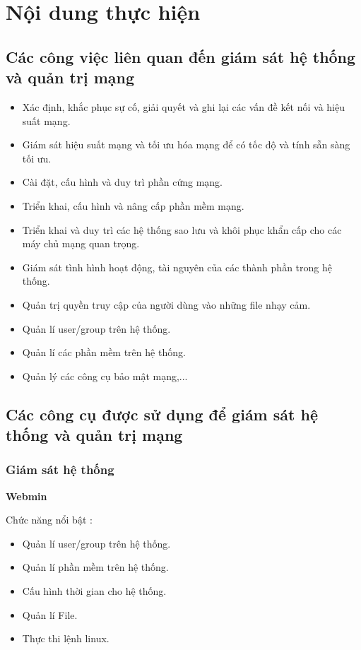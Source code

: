 \chapter{Nội dung thực hiện} \label{chap:theory}
    \section{Các công việc liên quan đến giám sát hệ
    	thống và quản trị mạng}
    	\begin{itemize}
    		\item Xác định, khắc phục sự cố, giải quyết và ghi lại các vấn đề kết nối và hiệu suất mạng.
    		\item Giám sát hiệu suất mạng và tối ưu hóa mạng để có tốc độ và tính sẵn sàng tối ưu.
    		\item Cài đặt, cấu hình và duy trì phần cứng mạng.
    		\item Triển khai, cấu hình và nâng cấp phần mềm mạng.
    		\item Triển khai và duy trì các hệ thống sao lưu và khôi phục khẩn cấp cho các máy chủ mạng quan trọng.
    		\item Giám sát tình hình hoạt động, tài nguyên của các thành phần trong hệ thống.
    		\item Quản trị quyền truy cập của người dùng vào những file nhạy cảm.
    		\item Quản lí user/group trên hệ thống.
    		\item Quản lí các phần mềm trên hệ thống.
    		\item Quản lý các công cụ bảo mật mạng,...
    	\end{itemize}

   	\section{Các công cụ được sử dụng để giám sát hệ thống và quản trị mạng}
   		\subsection{Giám sát hệ thống}
   		\textbf {Webmin}
   		
   		Chức năng nổi bật :
	   		\begin{itemize}
	   			\item Quản lí user/group trên hệ thống.
	   			\item Quản lí phần mềm trên hệ thống.
	   			\item Cấu hình thời gian cho hệ thống.
				\item Quản lí File.
				\item Thực thi lệnh linux.
	   		\end{itemize}
   	
